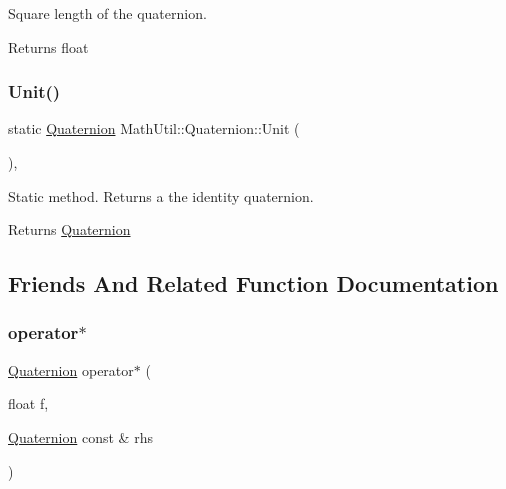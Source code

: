 Square length of the quaternion. 

\begin{DoxyReturn}{Returns}
float 
\end{DoxyReturn}
\mbox{\label{structMathUtil_1_1Quaternion_ae3460ce6b0259b013efb199bc5da32c9}} 
\subsubsection{\texorpdfstring{Unit()}{Unit()}}
{\footnotesize\ttfamily static \hyperlink{structMathUtil_1_1Quaternion}{Quaternion} Math\+Util\+::\+Quaternion\+::\+Unit (\begin{DoxyParamCaption}{ }\end{DoxyParamCaption})\hspace{0.3cm}{\ttfamily [inline]}, {\ttfamily [static]}}



Static method. Returns a the identity quaternion. 

\begin{DoxyReturn}{Returns}
\hyperlink{structMathUtil_1_1Quaternion}{Quaternion} 
\end{DoxyReturn}


\subsection{Friends And Related Function Documentation}
\mbox{\label{structMathUtil_1_1Quaternion_a047591b16ace29c20014c06c1e3f56ee}} 
\subsubsection{\texorpdfstring{operator$\ast$}{operator*}\hspace{0.1cm}{\footnotesize\ttfamily [1/2]}}
{\footnotesize\ttfamily \hyperlink{structMathUtil_1_1Quaternion}{Quaternion} operator$\ast$ (\begin{DoxyParamCaption}\item[{float}]{f,  }\item[{\hyperlink{structMathUtil_1_1Quaternion}{Quaternion} const \&}]{rhs }\end{DoxyParamCaption})\hspace{0.3cm}{\ttfamily [friend]}}



